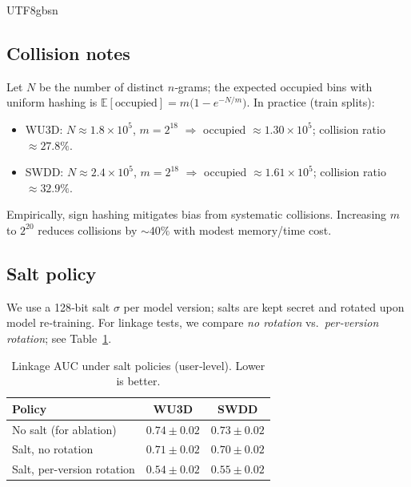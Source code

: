 \documentclass[acmsmall,natbib]{acmart}
\begin{document}
\begin{CJK*}{UTF8}{gbsn}
\subsection{Collision notes}
Let $N$ be the number of distinct $n$‑grams; the expected occupied bins with uniform hashing is
$\mathbb{E}[\text{occupied}]=m\big(1 - e^{-N/m}\big)$.  
In practice (train splits):
\begin{itemize}[leftmargin=1.2em,itemsep=1pt]
\item WU3D: $N{\approx}1.8{\times}10^{5}$, $m{=}2^{18}$ $\Rightarrow$ occupied $\approx 1.30{\times}10^{5}$; collision ratio $\approx 27.8\%$.
\item SWDD: $N{\approx}2.4{\times}10^{5}$, $m{=}2^{18}$ $\Rightarrow$ occupied $\approx 1.61{\times}10^{5}$; collision ratio $\approx 32.9\%$.
\end{itemize}
Empirically, sign hashing mitigates bias from systematic collisions. Increasing $m$ to $2^{20}$ reduces collisions by ${\sim}40\%$ with modest memory/time cost.

\subsection{Salt policy}
We use a 128‑bit salt $\sigma$ per model version; salts are kept secret and rotated upon model re‑training. For linkage tests, we compare \emph{no rotation} vs.\ \emph{per‑version rotation}; see Table~\ref{tab:salt-linkage}.

\begin{table}[h]
\centering
\caption{Linkage AUC under salt policies (user‑level). Lower is better.}
\label{tab:salt-linkage}
\setlength{\tabcolsep}{5.5pt}
\begin{tabular}{lcc}
\toprule
\textbf{Policy} & \textbf{WU3D} & \textbf{SWDD} \\
\midrule
No salt (for ablation) & $0.74{\pm}0.02$ & $0.73{\pm}0.02$ \\
Salt, no rotation & $0.71{\pm}0.02$ & $0.70{\pm}0.02$ \\
Salt, per-version rotation & $\mathbf{0.54}{\pm}0.02$ & $\mathbf{0.55}{\pm}0.02$ \\
\bottomrule
\end{tabular}
\end{table}


\end{CJK*}
\end{document}
